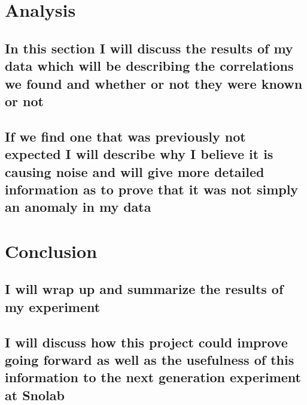 \section{Analysis}
\subsection{In this section I will discuss the results of my data which will be describing the correlations we found and whether or not they were known or not}
\subsection{If we find one that was previously not expected I will describe why I believe it is causing noise and will give more detailed information as to prove that it was not simply an anomaly in my data}
\section{Conclusion}
\subsection{I will wrap up and summarize the results of my experiment}

\subsection{I will discuss how this project could improve going forward as well as the usefulness of this information to the next generation experiment at Snolab}
